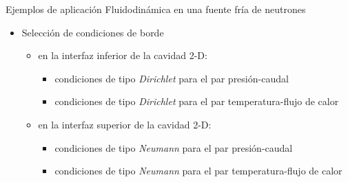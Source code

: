 \begin{frame}
{Ejemplos de aplicación}
{Fluidodinámica en una fuente fría de neutrones}

\begin{itemize}
\item Selección de condiciones de borde
  \begin{itemize}
  \item en la interfaz inferior de la cavidad 2-D:
      \begin{itemize}
      \item condiciones de tipo \textit{Dirichlet} para el par presión-caudal
      \item condiciones de tipo \textit{Dirichlet} para el par temperatura-flujo de calor
      \end{itemize}
  \item en la interfaz superior de la cavidad 2-D:
      \begin{itemize}
      \item condiciones de tipo \textit{Neumann} para el par presión-caudal
      \item condiciones de tipo \textit{Neumann} para el par temperatura-flujo de calor
      \end{itemize}
  \end{itemize} 

\end{itemize}

\end{frame}



